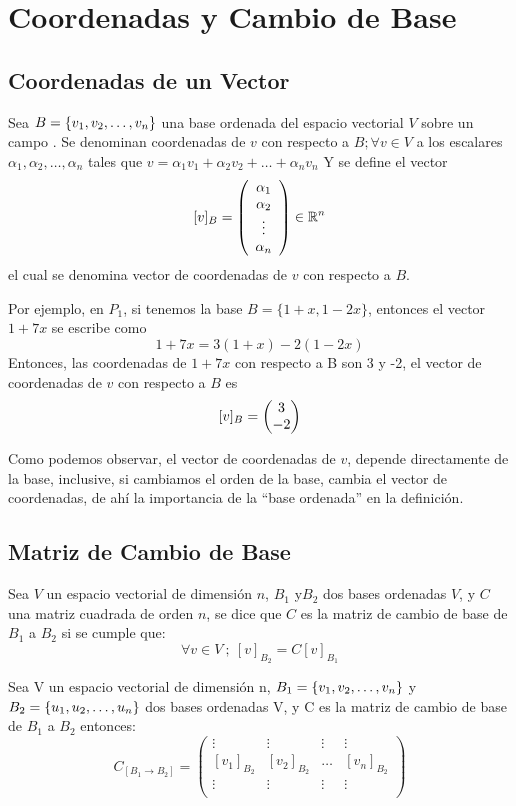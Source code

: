 
\chapter{Coordenadas y Cambio de Base}
\section{Coordenadas de un Vector}
\begin{dfn} 

Sea $B= \lbrace v_1, v_2, \ldots, v_n \rbrace$ una base ordenada del espacio vectorial $V$ sobre un campo \dobleK. Se denominan coordenadas de $v$ con respecto a $B; \forall v \in V$ a los escalares $\alpha _1,\alpha_2, \hdots, \alpha _n$ tales que
$v=\alpha_1 v_1+\alpha_2 v_2+ \hdots + \alpha_n v_n$
Y se define el vector $$[v]_B = \left( \begin{array}{c} \alpha_1\\ \alpha_2\\ \vdots\\ \alpha_n \end{array} \right)  \in  \mathbb{R}^n$$ el cual se denomina vector de coordenadas de $v$ con respecto a $B$. 
\end{dfn}

Por ejemplo, en $P_1$, si tenemos la base $B=\{1+x,1-2x\}$, entonces el vector $1+7x$ se escribe como
$$1+7x=3(1+x)-2(1-2x)$$
Entonces, las coordenadas de $1+7x$ con respecto a B son 3 y -2, el vector de coordenadas de $v$ con respecto a $B$ es $$[v]_B=\begin{pmatrix} 3\\ -2\\ \end{pmatrix} $$

Como podemos observar, el vector de coordenadas de $v$, depende directamente de la base, inclusive, si cambiamos el orden de la base, cambia el vector de coordenadas, de ahí la importancia de la “base ordenada” en la definición.

\section{Matriz de Cambio de Base}
\begin{dfn} Sea $V$ un espacio vectorial de dimensión $n$, $ B_1$  y$ B_2$  dos bases ordenadas $V$, y $C$ una matriz cuadrada de orden $n$, se dice que $C$ es la matriz de cambio de base de $B_1$ a $B_2$ si se cumple que:
$$\forall v \in V \ ; \ [v]_{B_2}=C[v]_{B_1}$$
\end{dfn}

\begin{theorem}


Sea V un espacio vectorial de dimensión n, $B_1= \lbrace v_1, v_2, \ldots, v_n \rbrace$  y $B_2= \lbrace u_1, u_2, \ldots, u_n \rbrace$  dos bases ordenadas V, y C es la matriz de cambio de base de $B_1$ a $B_2$ entonces:
\[C_{[B_1 \rightarrow B_2]}= \begin{pmatrix}
\vdots & \vdots & \vdots & \vdots\\
\left[v_1\right]_{B_2}&\left[v_2\right]_{B_2}& \hdots & \left[v_n\right]_{B_2}\\
\vdots & \vdots & \vdots & \vdots\\
\end{pmatrix}\]
\end{theorem}

